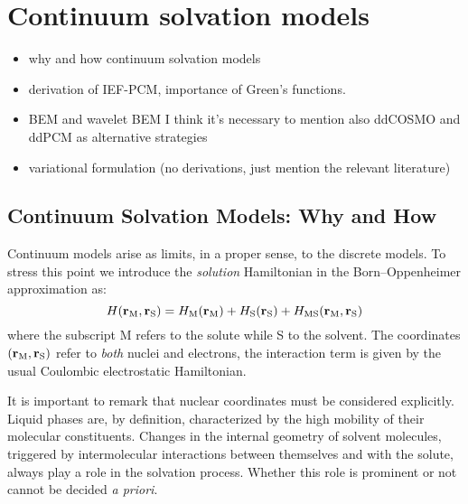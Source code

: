\chapter{Continuum solvation models}\label{ch:CSM}

\begin{itemize}
    \item why and how continuum solvation models
    \item derivation of \acs{IEF}-\acs{PCM}, importance of Green's
      functions.
    \item \ac{BEM} and wavelet \acs{BEM} I think it's necessary to
      mention also ddCOSMO and ddPCM as alternative strategies
      ~\autocite{Cances2013-jg, Lipparini2013-cy, Lipparini2014-to,
      Lipparini2014-fq, Stamm2016-fv}
    \item variational formulation (no derivations, just mention the
      relevant literature)
\end{itemize}

\pagebreak

\section{Continuum Solvation Models: Why and How}\label{sec:CSM-why-how}

Continuum models arise as limits, in a proper sense, to the discrete
models. To stress this point we introduce the \emph{solution}
Hamiltonian in the Born--Oppenheimer approximation as:
\begin{equation}\label{eq:solution-ham}
 H(\mathbf{r}_\mathrm{M}, \mathbf{r}_\mathrm{S}) =
  H_\mathrm{M}(\mathbf{r}_\mathrm{M}) +  H_\mathrm{S}(\mathbf{r}_\mathrm{S})
+ H_\mathrm{MS}(\mathbf{r}_\mathrm{M}, \mathbf{r}_\mathrm{S})
\end{equation}
where the subscript M refers to the solute while S to the solvent. The
coordinates $(\mathbf{r}_\mathrm{M}, \mathbf{r}_\mathrm{S})$ refer to
\emph{both} nuclei and electrons, the interaction term is given by the
usual Coulombic electrostatic Hamiltonian.

It is important to remark that nuclear coordinates must be considered
explicitly. Liquid phases are, by definition, characterized by the high
mobility of their molecular constituents. Changes in the internal
geometry of solvent molecules, triggered by intermolecular interactions
between themselves and with the solute, always play a role in the
solvation process. Whether this role is prominent or not cannot be
decided \emph{a priori}.

